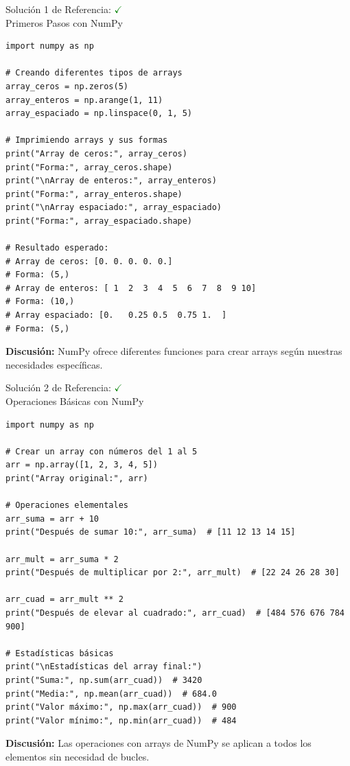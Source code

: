 \documentclass[10pt]{beamer}
\begin{document}
\begin{solutionblock}
\begin{frame}[fragile]{Solución 1 de Referencia: \hfill \textcolor{green}{$\checkmark$} \\ Primeros Pasos con NumPy}
\begin{verbatim}
import numpy as np

# Creando diferentes tipos de arrays
array_ceros = np.zeros(5)
array_enteros = np.arange(1, 11)
array_espaciado = np.linspace(0, 1, 5)

# Imprimiendo arrays y sus formas
print("Array de ceros:", array_ceros)
print("Forma:", array_ceros.shape)
print("\nArray de enteros:", array_enteros)
print("Forma:", array_enteros.shape)
print("\nArray espaciado:", array_espaciado)
print("Forma:", array_espaciado.shape)

# Resultado esperado:
# Array de ceros: [0. 0. 0. 0. 0.]
# Forma: (5,)
# Array de enteros: [ 1  2  3  4  5  6  7  8  9 10]
# Forma: (10,)
# Array espaciado: [0.   0.25 0.5  0.75 1.  ]
# Forma: (5,)
\end{verbatim}
\textbf{Discusión:} NumPy ofrece diferentes funciones para crear arrays según nuestras necesidades específicas.
\end{frame}
\end{solutionblock}

\begin{solutionblock}
\begin{frame}[fragile]{Solución 2 de Referencia: \hfill \textcolor{green}{$\checkmark$} \\ Operaciones Básicas con NumPy}
\begin{verbatim}
import numpy as np

# Crear un array con números del 1 al 5
arr = np.array([1, 2, 3, 4, 5])
print("Array original:", arr)

# Operaciones elementales
arr_suma = arr + 10
print("Después de sumar 10:", arr_suma)  # [11 12 13 14 15]

arr_mult = arr_suma * 2
print("Después de multiplicar por 2:", arr_mult)  # [22 24 26 28 30]

arr_cuad = arr_mult ** 2
print("Después de elevar al cuadrado:", arr_cuad)  # [484 576 676 784 900]

# Estadísticas básicas
print("\nEstadísticas del array final:")
print("Suma:", np.sum(arr_cuad))  # 3420
print("Media:", np.mean(arr_cuad))  # 684.0
print("Valor máximo:", np.max(arr_cuad))  # 900
print("Valor mínimo:", np.min(arr_cuad))  # 484
\end{verbatim}
\textbf{Discusión:} Las operaciones con arrays de NumPy se aplican a todos los elementos sin necesidad de bucles.
\end{frame}
\end{solutionblock}
\end{document}
